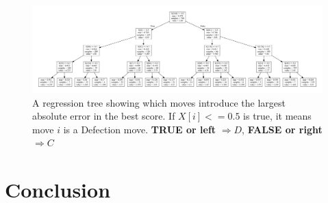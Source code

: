 \begin{figure}
    \includegraphics[width=1.0\textwidth, center]{./img/descriptive/reg_tree.pdf}
    \centering
    \caption{A regression tree showing which moves introduce the largest absolute error in the best score. If $X[i]<=0.5$ is true, it means move $i$ is a Defection move.
    \textbf{TRUE or left} $\Rightarrow D$, \textbf{FALSE or right} $\Rightarrow C$}
    \label{fig:reg_tree}
\end{figure}


\section{Conclusion}

